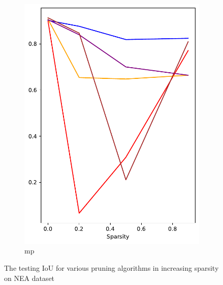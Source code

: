 \documentclass[mathematics,article,submit,pdftex,moreauthors]{Definitions/mdpi}
\begin{document}
\begin{figure}[!ht]
\begin{subfigure}[t]{.276\textwidth}
        \includegraphics[width=.95\linewidth]{figures/test/pruning-testing-score_NEA_movement.pdf}
        \caption{\ac{mp}}
        \label{fig:results:test:nea:mp}
      \end{subfigure}
      \caption{The testing IoU for various pruning algorithms in increasing sparsity on NEA dataset}
      \label{fig:results:test:nea}
\end{figure}
\end{document}
